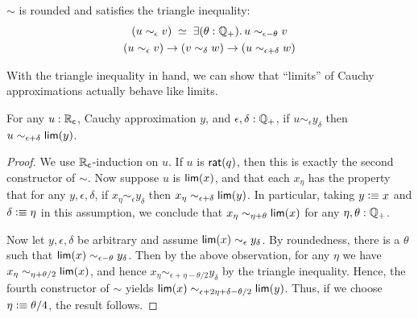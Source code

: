 \begin{cor}
  $\sim$ is rounded and satisfies the triangle inequality:
    \begin{gather}
      \eqvspaced{
        (u \sim_\epsilon v)
      }{
        \exis{\theta : \Qp} u \sim_{\epsilon - \theta} v
      }\\
      (u\sim_\epsilon v) \to (v\sim_\delta w) \to (u\sim_{\epsilon+\delta} w)\label{item:RC-sim-triangle}
    \end{gather}
\end{cor}

With the triangle inequality in hand, we can show that ``limits'' of Cauchy approximations actually behave like limits.

\begin{lem}\label{thm:RC-sim-lim}
  For any $u:\mathbb{R}_\mathsf{c}$, Cauchy approximation $y$, and $\epsilon,\delta:\mathbb{Q}_{+}$, if $u\sim_\epsilon y_\delta$ then $u\sim_{\epsilon+\delta} \mathsf{lim}(y)$.
\end{lem}
\begin{proof}
  We use $\mathbb{R}_\mathsf{c}$-induction on $u$.
  If $u$ is $\mathsf{rat}(q)$, then this is exactly the second constructor of $\sim$.
  Now suppose $u$ is $\mathsf{lim}(x)$, and that each $x_\eta$ has the property that for any $y,\epsilon,\delta$, if $x_\eta\sim_\epsilon y_\delta$ then $x_\eta \sim_{\epsilon+\delta} \mathsf{lim}(y)$.
  In particular, taking $y\vcentcolon\equiv x$ and $\delta\vcentcolon\equiv\eta$ in this assumption, we conclude that $x_\eta \sim_{\eta+\theta} \mathsf{lim}(x)$ for any $\eta,\theta:\mathbb{Q}_{+}$.

  Now let $y,\epsilon,\delta$ be arbitrary and assume $\mathsf{lim}(x) \sim_\epsilon y_\delta$.
  By roundedness, there is a $\theta$ such that $\mathsf{lim}(x) \sim_{\epsilon-\theta} y_\delta$.
  Then by the above observation, for any $\eta$ we have $x_\eta \sim_{\eta+\theta/2} \mathsf{lim}(x)$, and hence $x_\eta \sim_{\epsilon+\eta-\theta/2} y_\delta$ by the triangle inequality.
  Hence, the fourth constructor of $\sim$ yields $\mathsf{lim}(x) \sim_{\epsilon+2\eta+\delta-\theta/2} \mathsf{lim}(y)$.
  Thus, if we choose $\eta \vcentcolon\equiv \theta/4$, the result follows.
\end{proof}

